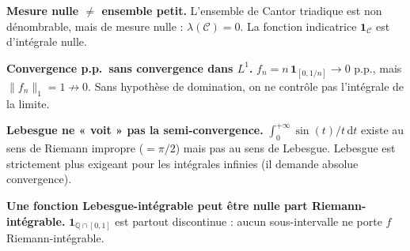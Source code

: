 \begin{mdframed}[style=cexbar]
  \textbf{Mesure nulle $\neq$ ensemble petit.}\enspace%
  L'ensemble de Cantor triadique est non dénombrable, mais de mesure nulle :
  $\lambda(\mathcal{C}) = 0$. La fonction indicatrice $\mathbf{1}_\mathcal{C}$
  est d'intégrale nulle.

  \smallskip\noindent
  \textbf{Convergence p.p.\ sans convergence dans $L^1$.}\enspace%
  $f_n = n\,\mathbf{1}_{[0,1/n]} \to 0$ p.p., mais $\|f_n\|_1 = 1 \not\to 0$.
  Sans hypothèse de domination, on ne contrôle pas l'intégrale de la limite.

  \smallskip\noindent
  \textbf{Lebesgue ne « voit » pas la semi-convergence.}\enspace%
  $\int_0^{+\infty}\sin(t)/t\,\mathrm{d}t$ existe au sens de Riemann impropre
  ($=\pi/2$) mais pas au sens de Lebesgue. Lebesgue est strictement plus
  exigeant pour les intégrales infinies (il demande absolue convergence).

  \smallskip\noindent
  \textbf{Une fonction Lebesgue-intégrable peut être nulle part Riemann-intégrable.}\enspace%
  $\mathbf{1}_{\mathbb{Q}\cap[0,1]}$ est partout discontinue : aucun
  sous-intervalle ne porte $f$ Riemann-intégrable.
\end{mdframed}

\vspace{6pt}
\exolabel

